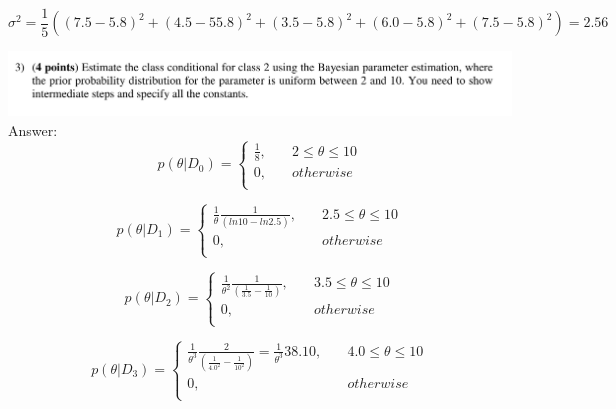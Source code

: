 \documentclass{article}
\begin{document}
\begin{equation*}
\sigma^2= \frac{1}{5}((7.5-5.8)^2+ (4.5-55.8)^2+(3.5-5.8)^2+(6.0-5.8)^2 + (7.5-5.8)^2)=2.56
\end{equation*}

\includegraphics[width=1\columnwidth]{problem2_3.png}
Answer:\\
\begin{equation*}
p(\theta|D_0)=\left\{
\begin{aligned}
\frac{1}{8},&\quad 2\leq \theta \leq 10\\
0,&\quad otherwise
\\
\end{aligned}
\right.
\end{equation*}

\begin{equation*}
p(\theta|D_1)=\left\{
\begin{aligned}
\frac{1}{\theta}\frac{1}{(ln10-ln2.5)},&\quad 2.5\leq \theta \leq 10\\
0,&\quad otherwise
\\
\end{aligned}
\right.
\end{equation*}

\begin{equation*}
p(\theta|D_2)=\left\{
\begin{aligned}
\frac{1}{\theta^2}\frac{1}{(\frac{1}{3.5}-\frac{1}{10})},&\quad 3.5\leq \theta \leq 10\\
0,&\quad otherwise
\\
\end{aligned}
\right.
\end{equation*}



\begin{equation*}
p(\theta|D_3)=\left\{
\begin{aligned}
\frac{1}{\theta^3}\frac{2}{(\frac{1}{4.0^2}-\frac{1}{10^2})}=\frac{1}{\theta^3}{38.10},&\quad 4.0\leq \theta \leq 10\\
0,&\quad otherwise
\\
\end{aligned}
\right.
\end{equation*}
\end{document}
